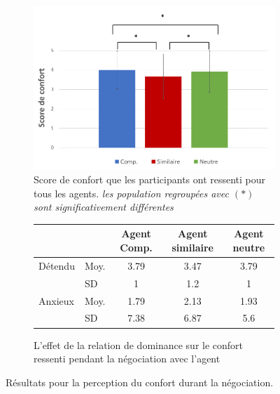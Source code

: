 	
		\begin{figure}[h]
			
			\begin{subfigure}[h]{0.8\textwidth}
				\centering
				\includegraphics[clip=false]{Figures/chap7/confort.PNG}
				\caption{ Score de confort que les participants ont ressenti pour tous les agents. \textit{les population regroupées avec $(*)$ sont significativement différentes }}
			\end{subfigure}
			
			\begin{subfigure}[h]{0.8\textwidth}
				\centering
				 \begin{tabular}{ l l c c c  }
				 	\hline
				 	\textbf{ }& & \textbf{Agent Comp.} & \textbf{Agent similaire} & \textbf{Agent neutre} \\ 
				 	\hline
				 	\newline \newline\multirow{2}{*} {Détendu} & Moy. &3.79 & 3.47 & 3.79 \\
				 	\newline  & SD & 1 & 1.2 & 1 \\
				 	\hline
				 	
				 	\newline \newline\multirow{2}{*} {Anxieux} & Moy. & 1.79 & 2.13 & 1.93 \\
				 	\newline  & SD & 7.38 & 6.87 & 5.6 \\
				 	\hline
				 \end{tabular}
			 	\caption{L'effet de la relation de dominance sur le confort ressenti pendant la négociation avec l'agent} 
			\end{subfigure}
			\caption{Résultats pour la perception du confort durant la négociation.}
			\label{tab:confort}
		\end{figure}	
	\vspace{- 1 em}
